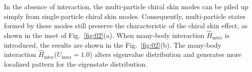 \documentclass[longbibliography, aps, prx, amsmath, amssymb, amsfonts, twocolumn,superscriptaddress, footinbib]{revtex4-1}
\begin{document}
	In the absence of interaction, the multi-particle chiral skin modes can be piled up simply from single-particle chiral skin modes. Consequently, multi-particle states formed by these modes still preserve the characteristic of the chiral skin effect, as shown in the inset of Fig.~\ref{fig:02}(a).
	When many-body interaction $\hat{H}_{\text{inter}}$ is introduced, the results are shown in the Fig.~\ref{fig:02}(b). The many-body interaction $\hat{H}_{\text{inter}}$($U_{\text{inter}}=1.0$) alters eigenvalue distribution and generates more localized pattern for the eigenstate distribution. 




	
\end{document}
